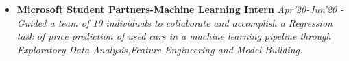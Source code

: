 \documentclass{article}
\begin{document}
\begin{itemize}
    \item{\textbf{\large{Microsoft Student Partners-Machine Learning Intern}}} \hfill \textit{Apr'20-Jun'20}
          \newline
          \textit{-Guided a team of 10 individuals to collaborate and accomplish a Regression task of price prediction of used cars in a machine learning pipeline through Exploratory Data Analysis,Feature Engineering and Model Building.}
\end{itemize}





\end{document}
